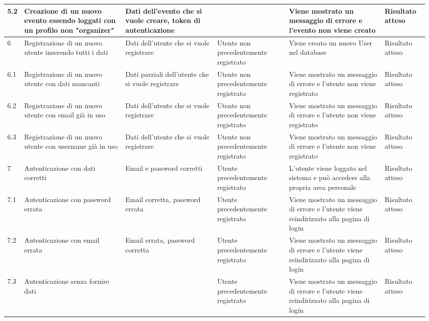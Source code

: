 \documentclass[9pt]{extarticle}
\begin{document}
\begin{table}[!htb]
{\begin{tabular}{p{.5cm} p{3.5cm} p{2.5cm} p{2.5cm} p{5cm} p{1.5cm}}
		5.2 & Creazione di un nuovo evento essendo loggati con un profilo non  "organizer" & Dati dell'evento che si vuole creare, token di autenticazione &                                             & Viene mostrato un messaggio di errore e l'evento non viene creato                                              & Risultato atteso      \\ \midrule
		6 &  Registrazione di un nuovo utente inserendo tutti i dati & Dati dell'utente che si vuole registrare & Utente non precedentemente registrato & Viene creato un nuovo User nel database & Risultato atteso \\\midrule
		6.1 &  Registrazione di un nuovo utente con dati mancanti & Dati parziali dell'utente che si vuole registrare & Utente non precedentemente registrato & Viene mostrato un messaggio di errore e l'utente non viene registrato & Risultato atteso \\\midrule
		6.2 &  Registrazione di un nuovo utente con email già in uso & Dati dell'utente che si vuole registrare & Utente non precedentemente registrato & Viene mostrato un messaggio di errore e l'utente non viene registrato & Risultato atteso \\\midrule
		6.3 &  Registrazione di un nuovo utente con username già in uso & Dati dell'utente che si vuole registrare & Utente non precedentemente registrato & Viene mostrato un messaggio di errore e l'utente non viene registrato & Risultato atteso \\\midrule
		7 &  Autenticazione con dati corretti & Email e password corretti & Utente precedentemente registrato & L'utente viene loggato nel sistema e può accedere alla propria area personale & Risultato atteso \\\midrule
		7.1 &  Autenticazione con password errata  & Email corretta, password errata & Utente precedentemente registrato & Viene mostrato un messaggio di errore e l'utente viene reindirizzato alla pagina di login & Risultato atteso \\\midrule
		7.2 &  Autenticazione con email errata  & Email errata, password corretta & Utente precedentemente registrato & Viene mostrato un messaggio di errore e l'utente viene reindirizzato alla pagina di login & Risultato atteso \\\midrule
		7.3 &  Autenticazione senza fornire dati  &  & Utente precedentemente registrato & Viene mostrato un messaggio di errore e l'utente viene reindirizzato alla pagina di login & Risultato atteso \\\midrule		
	\end{tabular}
}

\end{table}
\end{document}
